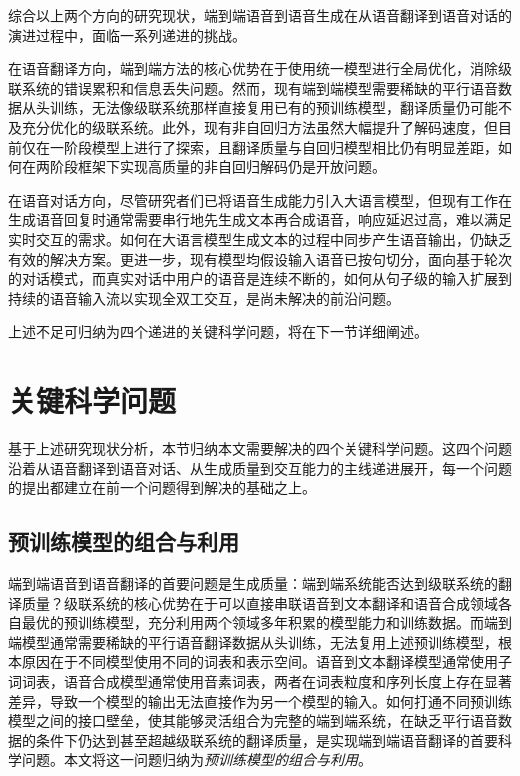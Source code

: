 综合以上两个方向的研究现状，端到端语音到语音生成在从语音翻译到语音对话的演进过程中，面临一系列递进的挑战。

在语音翻译方向，端到端方法的核心优势在于使用统一模型进行全局优化，消除级联系统的错误累积和信息丢失问题。然而，现有端到端模型需要稀缺的平行语音数据从头训练，无法像级联系统那样直接复用已有的预训练模型，翻译质量仍可能不及充分优化的级联系统。此外，现有非自回归方法虽然大幅提升了解码速度，但目前仅在一阶段模型上进行了探索，且翻译质量与自回归模型相比仍有明显差距，如何在两阶段框架下实现高质量的非自回归解码仍是开放问题。

在语音对话方向，尽管研究者们已将语音生成能力引入大语言模型，但现有工作在生成语音回复时通常需要串行地先生成文本再合成语音，响应延迟过高，难以满足实时交互的需求。如何在大语言模型生成文本的过程中同步产生语音输出，仍缺乏有效的解决方案。更进一步，现有模型均假设输入语音已按句切分，面向基于轮次的对话模式，而真实对话中用户的语音是连续不断的，如何从句子级的输入扩展到持续的语音输入流以实现全双工交互，是尚未解决的前沿问题。

上述不足可归纳为四个递进的关键科学问题，将在下一节详细阐述。


\section{关键科学问题}

基于上述研究现状分析，本节归纳本文需要解决的四个关键科学问题。这四个问题沿着从语音翻译到语音对话、从生成质量到交互能力的主线递进展开，每一个问题的提出都建立在前一个问题得到解决的基础之上。

\subsection{预训练模型的组合与利用}

端到端语音到语音翻译的首要问题是生成质量：端到端系统能否达到级联系统的翻译质量？级联系统的核心优势在于可以直接串联语音到文本翻译和语音合成领域各自最优的预训练模型，充分利用两个领域多年积累的模型能力和训练数据。而端到端模型通常需要稀缺的平行语音翻译数据从头训练，无法复用上述预训练模型，根本原因在于不同模型使用不同的词表和表示空间。语音到文本翻译模型通常使用子词词表，语音合成模型通常使用音素词表，两者在词表粒度和序列长度上存在显著差异，导致一个模型的输出无法直接作为另一个模型的输入。如何打通不同预训练模型之间的接口壁垒，使其能够灵活组合为完整的端到端系统，在缺乏平行语音数据的条件下仍达到甚至超越级联系统的翻译质量，是实现端到端语音翻译的首要科学问题。本文将这一问题归纳为\textit{预训练模型的组合与利用}。

